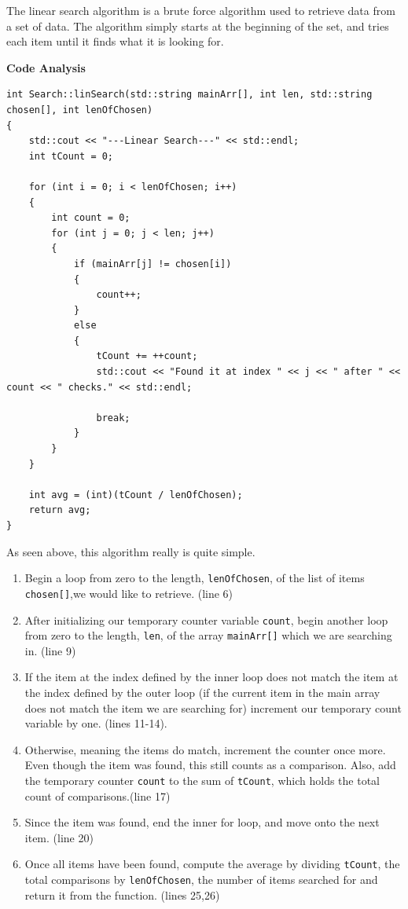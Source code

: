 \documentclass[letterpaper, 10pt]{article}
\begin{document}
The linear search algorithm is a brute force algorithm used to retrieve data from a set of data. The algorithm simply starts at the beginning of the set, and tries each item until it finds what it is looking for.
\vspace{1em}
\begin{center}
    \textbf{Code Analysis}
\end{center}
\begin{addmargin}[-5em]{1em}
\begin{small}
\begin{verbatim}
int Search::linSearch(std::string mainArr[], int len, std::string chosen[], int lenOfChosen)
{
	std::cout << "---Linear Search---" << std::endl;
	int tCount = 0;

	for (int i = 0; i < lenOfChosen; i++)
	{
		int count = 0;
		for (int j = 0; j < len; j++)
		{
			if (mainArr[j] != chosen[i])
			{
				count++;
			}
			else
			{
				tCount += ++count;
				std::cout << "Found it at index " << j << " after " << count << " checks." << std::endl;

				break;
			}
		}
	}

	int avg = (int)(tCount / lenOfChosen);
	return avg;
}

\end{verbatim}
\end{small}
\end{addmargin}

As seen above, this algorithm really is quite simple.
\vspace{1em}


\begin{enumerate}
    \item Begin a loop from zero to the length, \texttt{lenOfChosen}, of the list of items \texttt{chosen[]},we would like to retrieve. (line 6)
    \item After initializing our temporary counter variable \texttt{count}, begin another loop from zero to the length, \texttt{len}, of the array \texttt{mainArr[]} which we are searching in. (line 9)
    \item If the item at the index defined by the inner loop does not match the item at the index defined by the outer loop (if the current item in the main array does not match the item we are searching for) increment our temporary count variable by one. (lines 11-14).
    \item Otherwise, meaning the items do match, increment the counter once more. Even though the item was found, this still counts as a comparison. Also, add the temporary counter \texttt{count} to the sum of \texttt{tCount}, which holds the total count of comparisons.(line 17)
    \item Since the item was found, end the inner for loop, and move onto the next item. (line 20)
    \item Once all items have been found, compute the average by dividing \texttt{tCount}, the total comparisons by \texttt{lenOfChosen}, the number of items searched for and return it from the function. (lines 25,26)
\end{enumerate}
\end{document}
